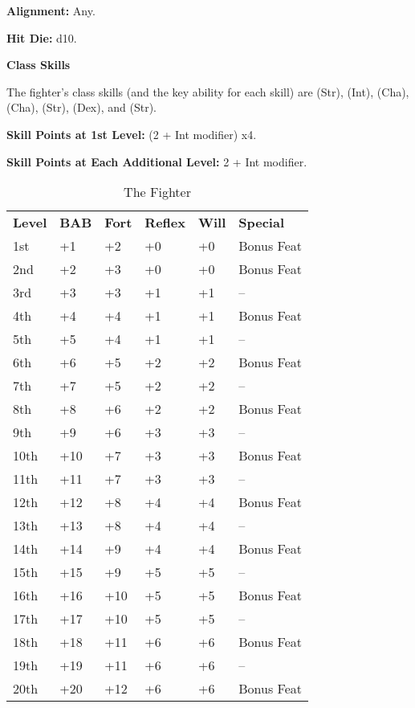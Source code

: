
\textbf{Alignment:} Any.

\textbf{Hit Die:} d10.

\textbf{Class Skills}

The fighter's class skills (and the key ability for each skill) are  (Str), 
 (Int),  (Cha),  (Cha),  (Str),  (Dex), and 
 (Str).

\textbf{Skill Points at 1st Level:} (2 + Int modifier) x4.

\textbf{Skill Points at Each Additional Level:} 2 + Int modifier.

\begin{table}[htb]
\caption{The Fighter}
\centering
\begin{tabular}{*{6}{l}}
\textbf{Level} & \textbf{BAB} & \textbf{Fort} & \textbf{Reflex} & \textbf{Will} & \textbf{Special} \\
1st & +1 & +2 & +0 & +0 & Bonus Feat \\
2nd & +2 & +3 & +0 & +0 & Bonus Feat \\
3rd & +3 & +3 & +1 & +1 & -- \\
4th & +4 & +4 & +1 & +1 & Bonus Feat \\
5th & +5 & +4 & +1 & +1 & -- \\
6th & +6 & +5 & +2 & +2 & Bonus Feat \\
7th & +7 & +5 & +2 & +2 & -- \\
8th & +8 & +6 & +2 & +2 & Bonus Feat \\
9th & +9 & +6 & +3 & +3 & -- \\
10th & +10 & +7 & +3 & +3 & Bonus Feat \\
11th & +11 & +7 & +3 & +3 & -- \\
12th & +12 & +8 & +4 & +4 & Bonus Feat \\
13th & +13 & +8 & +4 & +4 & -- \\
14th & +14 & +9 & +4 & +4 & Bonus Feat \\
15th & +15 & +9 & +5 & +5 & -- \\
16th & +16 & +10 & +5 & +5 & Bonus Feat \\
17th & +17 & +10 & +5 & +5 & -- \\
18th & +18 & +11 & +6 & +6 & Bonus Feat \\
19th & +19 & +11 & +6 & +6 & -- \\
20th & +20 & +12 & +6 & +6 & Bonus Feat \\
\end{tabular}
\end{table}


